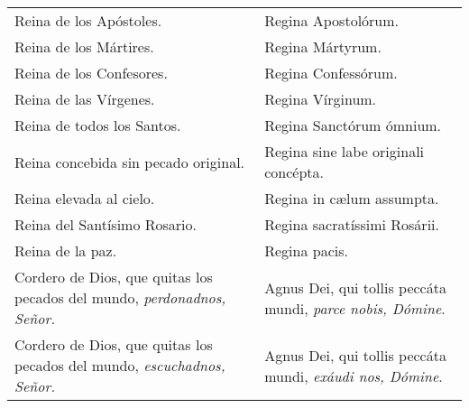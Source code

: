 \documentclass[./rosary.tex]{subfiles}
\begin{document}
\begin{longtable} { p{} p{} }
    Reina de los Apóstoles.                                                                                                  & Regina Apos­to­lórum.                          \\
    Reina de los Mártires.                                                                                                   & Regina Mártyrum.                             \\
    Reina de los Confesores.                                                                                                 & Regina Con­fe­ssórum.                          \\
    Reina de las Vírgenes.                                                                                                   & Regina Vírginum.                             \\
    Reina de todos los Santos.                                                                                               & Regina Sanctórum ómnium.                     \\
    Reina concebida sin pecado original.                                                                                     & Regina sine labe originali concépta.         \\
    Reina elevada al cielo.                                                                                                  & Regina in cælum assumpta.                    \\
    Reina del Santísimo Rosario.                                                                                             & Regina sa­cra­tíssimi Rosárii.                 \\
    Reina de la paz.                                                                                                         & Regina pacis.                                \\
    Cordero de Dios, que quitas los pecados del mundo, \emph{perdonadnos, Señor.}                                            &
    Agnus Dei, qui tollis peccáta mundi, \emph{parce nobis, Dómine}.                                                                                                        \\
    Cordero de Dios, que quitas los pecados del mundo, \emph{escuchadnos, Señor.}                                            &
    Agnus Dei, qui tollis peccáta mundi, \emph{exáudi nos, Dómine}.                                                                                                         \\

\end{longtable}
\end{document}

